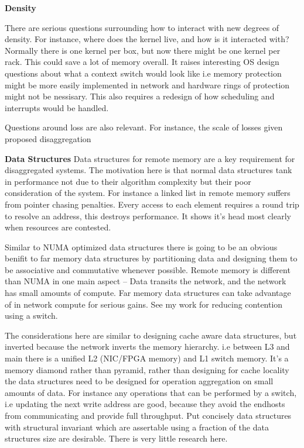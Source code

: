 \textbf{Density}

There are serious questions surrounding how to interact with new degrees of
density. For instance, where does the kernel live, and how is it interacted
with? Normally there is one kernel per box, but now there might be one kernel
per rack. This could save a lot of memory overall. It raises interesting OS
design questions about what a context switch would look like i.e memory
protection might be more easily implemented in network and hardware rings of
protection might not be nessisary. This also requires a redesign of how
scheduling and interrupts would be handled.

Questions around loss are also relevant. For instance, the scale of losses given
proposed disaggregation 


\textbf{Data Structures} Data structures for remote memory are a key requirement
for disaggregated systems. The motivation here is that normal data structures
tank in performance not due to their algorithm complexity but their poor
consideration of the system. For instance a linked list in remote memory suffers
from pointer chasing penalties. Every access to each element requires a round
trip to resolve an address, this destroys performance. It shows it's head most
clearly when resources are contested.

Similar to NUMA optimized data structures there is going to be an obvious
benifit to far memory data structures by partitioning data and designing them to
be associative and commutative whenever possible. Remote memory is different than
NUMA in one main aspect -- Data transits the network, and the network has small
amounts of compute. Far memory data structures can take advantage of in network
compute for serious gains. See my work for reducing contention using a switch.

The considerations here are similar to designing cache aware data structures,
but inverted because the network inverts the memory hierarchy. i.e between L3 and
main there is a unified L2 (NIC/FPGA memory) and L1 switch memory. It's a memory
diamond rather than pyramid, rather than designing for cache locality the data
structures need to be designed for operation aggregation on small amounts of
data. For instance any operations that can be performed by a switch, i.e
updating the next write address are good, because they avoid the endhosts from
communicating and provide full throughput. Put concisely data structures with
structural invariant which are assertable using a fraction of the data
structures size are desirable. There is very little research here.

